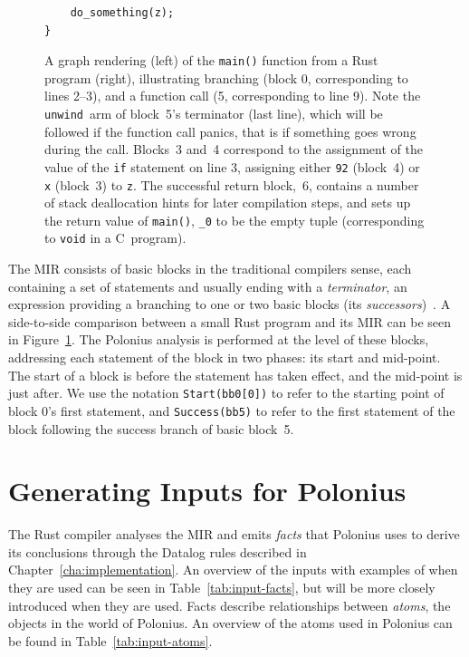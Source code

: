 \documentclass[11pt,a4paper,twoside,openany,draft]{report}
\newenvironment{sourcecode}{\captionsetup{type=listing}}{}
\newcommand{\InRust}[1]{\texttt{#1}}
\begin{document}
\begin{figure}
\begin{minipage}{.5\textwidth}
\begin{sourcecode}
\begin{verbatim}
    do_something(z);
}
\end{verbatim}
\end{sourcecode}
\end{minipage}
\caption[MIR of a Small Rust Program With Function Call]{A graph rendering
  (left) of the \InRust{main()} function from a Rust program (right),
  illustrating branching (block 0, corresponding to lines 2--3), and a function
  call (5, corresponding to line 9). Note the \texttt{unwind}~arm of block~5's
  terminator (last line), which will be followed if the function call panics,
  that is if something goes wrong during the call. Blocks~3 and~4 correspond to
  the assignment of the value of the \InRust{if} statement on line 3, assigning
  either \InRust{92} (block~4) or \InRust{x} (block~3) to \InRust{z}. The
  successful return block,~6, contains a number of stack deallocation hints for
  later compilation steps, and sets up the return value of \InRust{main()},
  \InRust{_0} to be the empty tuple (corresponding to \texttt{void} in a
  C~program).}\label{fig:mir-example}
\end{figure}

The MIR consists of basic blocks in the traditional compilers sense, each
containing a set of statements and usually ending with a \emph{terminator}, an
expression providing a branching to one or two basic blocks (its
\emph{successors})~\cite{mir_rfc}. A side-to-side comparison between a small
Rust program and its MIR can be seen in Figure~\ref{fig:mir-example}. The
Polonius analysis is performed at the level of these blocks, addressing each
statement of the block in two phases: its start and mid-point. The start of a
block is before the statement has taken effect, and the mid-point is just after.
We use the notation \InRust{Start(bb0[0])} to refer to the starting point of
block 0's first statement, and \InRust{Success(bb5)} to refer to the first
statement of the block following the success branch of basic block~5.

\section{Generating Inputs for Polonius}

The Rust compiler analyses the MIR and emits \textit{facts} that Polonius uses
to derive its conclusions through the Datalog rules described in
Chapter~\ref{cha:implementation}. An overview of the inputs with examples of
when they are used can be seen in Table~\ref{tab:input-facts}, but will be more
closely introduced when they are used. Facts describe relationships between
\textit{atoms}, the objects in the world of Polonius. An overview of the atoms
used in Polonius can be found in Table~\ref{tab:input-atoms}.
\end{document}
